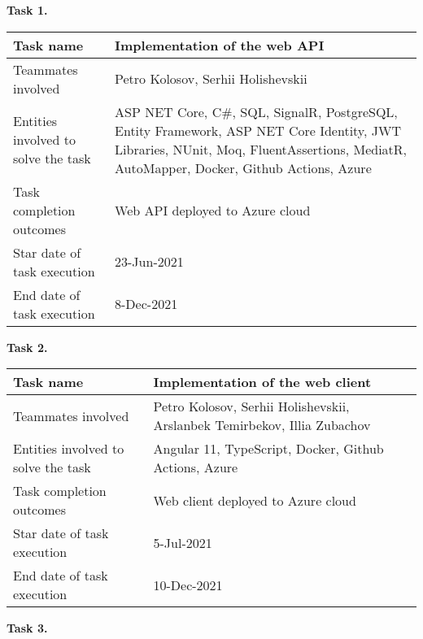 \textbf{Task 1.}\\
\begin{tabular}{|p{}|p{}|}
    \hline
    Task name                   & Implementation of the web API      \\
    \hline
    Teammates involved          & Petro Kolosov, Serhii Holishevskii \\
    \hline
    Entities involved to solve the task & ASP NET Core, C\#, SQL, SignalR, PostgreSQL,
    Entity Framework, ASP NET Core Identity,
    JWT Libraries, NUnit, Moq, FluentAssertions, MediatR, AutoMapper, Docker, Github Actions, Azure \\
    \hline
    Task completion outcomes    & Web API deployed to Azure cloud    \\
    \hline
    Star date of task execution & 23-Jun-2021                        \\
    \hline
    End date of task execution  & 8-Dec-2021                         \\
    \hline
\end{tabular}
\vskip 5mm
\hspace*{-6mm}\textbf{Task 2.}\\
\begin{tabular}{|p{}|p{}|}
    \hline
    Task name                           & Implementation of the web client                                         \\
    \hline
    Teammates involved                  & Petro Kolosov, Serhii Holishevskii, Arslanbek Temirbekov, Illia Zubachov \\
    \hline
    Entities involved to solve the task & Angular 11, TypeScript, Docker, Github Actions, Azure                    \\
    \hline
    Task completion outcomes            & Web client deployed to Azure cloud                                       \\
    \hline
    Star date of task execution         & 5-Jul-2021                                                               \\
    \hline
    End date of task execution          & 10-Dec-2021                                                              \\
    \hline
\end{tabular}
\vskip 5mm
\hspace*{-6mm}\textbf{Task 3.}\\
